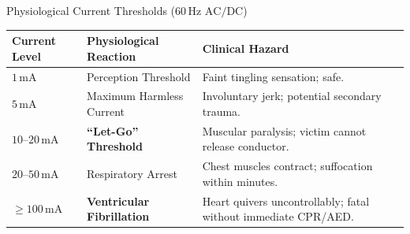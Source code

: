 \begin{frame}{Physiological Current Thresholds ($60\,\text{Hz}\text{ AC} / \text{DC}$)}
    \begin{table}[htbp]
        \small
        \centering
        \begin{tabularx}{\textwidth}{l p{4.2cm} X}
            \toprule
            \textbf{Current Level} & \textbf{Physiological Reaction} & \textbf{Clinical Hazard} \\
            \midrule
            $1\,\text{mA}$ & Perception Threshold & Faint tingling sensation; safe. \\
            $5\,\text{mA}$ & Maximum Harmless Current & Involuntary jerk; potential secondary trauma. \\
            $10\text{--}20\,\text{mA}$ & \textbf{``Let-Go'' Threshold} & Muscular paralysis; victim cannot release conductor. \\
            $20\text{--}50\,\text{mA}$ & Respiratory Arrest & Chest muscles contract; suffocation within minutes. \\
            $\ge 100\,\text{mA}$ & \textbf{Ventricular Fibrillation} & Heart quivers uncontrollably; fatal without immediate CPR/AED. \\
            \bottomrule
        \end{tabularx}
    \end{table}
\end{frame}

